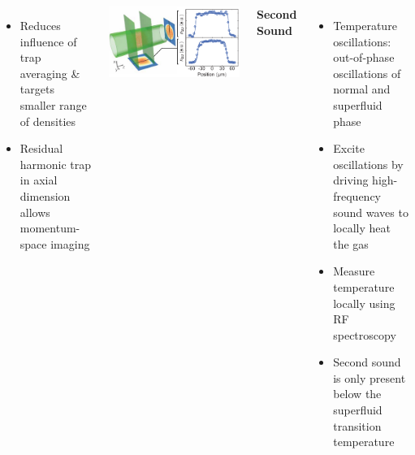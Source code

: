 \documentclass[26pt, paperwidth=36in,paperheight=48in]{tikzposter} %
\newcommand{\myfont}{\fontsize{24}{30}\selectfont}
\begin{document}
\begin{columns}
{\begin{minipage}{0.14\textwidth}
\begin{itemize}
		\item Reduces influence of trap averaging \& targets smaller range of densities
		
		\item Residual harmonic trap in axial dimension allows momentum-space imaging
	\end{itemize}
\end{minipage}
\hspace{0.2cm}
\begin{minipage}{0.15\textwidth}
	\centering
	\includegraphics[scale=1.2]{figures/box_cartoon.pdf}
\end{minipage}
\vspace{0.8cm}

} 
	
	
	
	
\block[]{\textcolor{BEC1blue}{Temperature Response -- Second Sound [3]}}
{
\begin{minipage}{0.21\textwidth}
	\flushleft
	\vspace{0.5cm}
	\textbf{Second Sound}
	\vspace{1cm}
	\myfont
	\begin{itemize}
		\item Temperature oscillations: out-of-phase oscillations of normal and superfluid phase
		
		
		\item Excite oscillations by driving high-frequency sound waves to locally heat the gas
		
		
		\item Measure temperature locally using RF spectroscopy
		
		
		\item Second sound is only present below the superfluid transition temperature 
		

\end{itemize}
\end{minipage}}
\end{columns}
\end{document}
